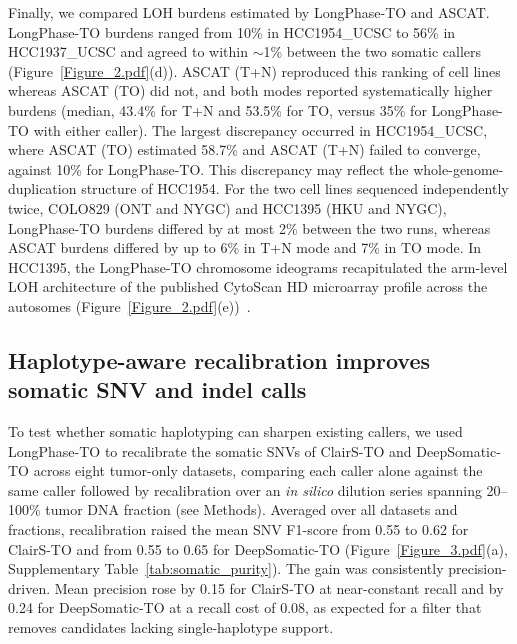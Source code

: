 \documentclass[pdflatex,sn-nature]{sn-jnl}
\begin{document}
Finally, we compared LOH burdens estimated by LongPhase-TO and ASCAT. LongPhase-TO burdens ranged from 10\% in HCC1954\_UCSC to 56\% in HCC1937\_UCSC and agreed to within $\sim$1\% between the two somatic callers (Figure~\ref{Figure_2.pdf}(d)). ASCAT (T+N) reproduced this ranking of cell lines whereas ASCAT (TO) did not, and both modes reported systematically higher burdens (median, 43.4\% for T+N and 53.5\% for TO, versus 35\% for LongPhase-TO with either caller). The largest discrepancy occurred in HCC1954\_UCSC, where ASCAT (TO) estimated 58.7\% and ASCAT (T+N) failed to converge, against 10\% for LongPhase-TO. This discrepancy may reflect the whole-genome-duplication structure of HCC1954. For the two cell lines sequenced independently twice, COLO829 (ONT and NYGC) and HCC1395 (HKU and NYGC), LongPhase-TO burdens differed by at most 2\% between the two runs, whereas ASCAT burdens differed by up to 6\% in T+N mode and 7\% in TO mode. In HCC1395, the LongPhase-TO chromosome ideograms recapitulated the arm-level LOH architecture of the published CytoScan HD microarray profile across the autosomes (Figure~\ref{Figure_2.pdf}(e))~\cite{fang2021}.


\subsection{Haplotype-aware recalibration improves somatic SNV and indel calls}
To test whether somatic haplotyping can sharpen existing callers, we used LongPhase-TO to recalibrate the somatic SNVs of ClairS-TO and DeepSomatic-TO across eight tumor-only datasets, comparing each caller alone against the same caller followed by recalibration over an \emph{in silico} dilution series spanning 20--100\% tumor DNA fraction (see Methods). Averaged over all datasets and fractions, recalibration raised the mean SNV F1-score from 0.55 to 0.62 for ClairS-TO and from 0.55 to 0.65 for DeepSomatic-TO (Figure~\ref{Figure_3.pdf}(a), Supplementary Table~\ref{tab:somatic_purity}). The gain was consistently precision-driven. Mean precision rose by 0.15 for ClairS-TO at near-constant recall and by 0.24 for DeepSomatic-TO at a recall cost of 0.08, as expected for a filter that removes candidates lacking single-haplotype support.
\end{document}
